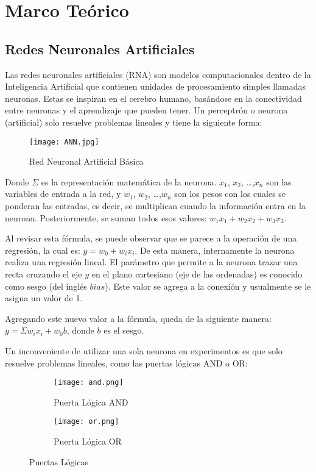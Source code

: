 \section{Marco Teórico}

\subsection{Redes Neuronales Artificiales}

Las redes neuronales artificiales (RNA) son modelos computacionales dentro de la Inteligencia Artificial que contienen unidades de procesamiento simples llamadas neuronas. Estas se inspiran en el cerebro humano, basándose en la conectividad entre neuronas y el aprendizaje que pueden tener. Un perceptrón o neurona (artificial) solo resuelve problemas lineales y tiene la siguiente forma:

\begin{figure}[H]
    \centering
    \texttt{[image: ANN.jpg]}
    \caption{Red Neuronal Artificial Básica}
    \label{fig:fig1}
\end{figure}

Donde $\Sigma$ es la representación matemática de la neurona. $x_1$, $x_2$, \dots ,$x_n$ son las variables de entrada a la red, y $w_1$, $w_2$, \dots ,$w_n$ son los pesos con los cuales se ponderan las entradas, es decir, se multiplican cuando la información entra en la neurona. Posteriormente, se suman todos esos valores: $w_1 x_1 + w_2 x_2 + w_3 x_3$. 

Al revisar esta fórmula, se puede observar que se parece a la operación de una regresión, la cual es: $y = w_0 + w_i x_i$. De esta manera, internamente la neurona realiza una regresión lineal. El parámetro que permite a la neurona trazar una recta cruzando el eje $y$ en el plano cartesiano (eje de las ordenadas) es conocido como sesgo (del inglés $bias$). Este valor se agrega a la conexión y usualmente se le asigna un valor de 1.

Agregando este nuevo valor a la fórmula, queda de la siguiente manera: $y = \Sigma w_i x_i + w_0 b$, donde $b$ es el sesgo. 

Un inconveniente de utilizar una sola neurona en experimentos es que solo resuelve problemas lineales, como las puertas lógicas AND o OR:

\begin{figure}[H]
    \begin{subfigure}[H]{0.49\textwidth}
        \texttt{[image: and.png]}
        \caption{Puerta Lógica AND}
        \label{fig:f1}
    \end{subfigure}
    \hfill
    \begin{subfigure}[H]{0.49\textwidth}
        \texttt{[image: or.png]}
        \caption{Puerta Lógica OR}
        \label{fig:f2}
    \end{subfigure}
    \caption{Puertas Lógicas}
\end{figure}

